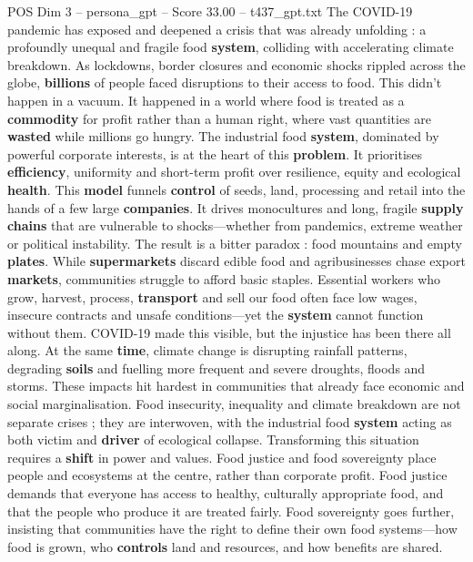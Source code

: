 \begin{textsample}{POS Dim 3 – persona\_gpt – Score 33.00 – t437\_gpt.txt}  \label{ex:f3_pos_023}
The COVID-19 pandemic has exposed and deepened a crisis that was already unfolding : a profoundly unequal and fragile food \textbf{system}, colliding with accelerating climate breakdown.
As lockdowns, border closures and economic shocks rippled across the globe, \textbf{billions} of people faced disruptions to their access to food.
This didn't happen in a vacuum.
It happened in a world where food is treated as a \textbf{commodity} for profit rather than a human right, where vast quantities are \textbf{wasted} while millions go hungry.
The industrial food \textbf{system}, dominated by powerful corporate interests, is at the heart of this \textbf{problem}.
It prioritises \textbf{efficiency}, uniformity and short-term profit over resilience, equity and ecological \textbf{health}.
This \textbf{model} funnels \textbf{control} of seeds, land, processing and retail into the hands of a few large \textbf{companies}.
It drives monocultures and long, fragile \textbf{supply} \textbf{chains} that are vulnerable to shocks—whether from pandemics, extreme weather or political instability.
The result is a bitter paradox : food mountains and empty \textbf{plates}.
While \textbf{supermarkets} discard edible food and agribusinesses chase export \textbf{markets}, communities struggle to afford basic staples.
Essential workers who grow, harvest, process, \textbf{transport} and sell our food often face low wages, insecure contracts and unsafe conditions—yet the \textbf{system} cannot function without them.
COVID-19 made this visible, but the injustice has been there all along.
At the same \textbf{time}, climate change is disrupting rainfall patterns, degrading \textbf{soils} and fuelling more frequent and severe droughts, floods and storms.
These impacts hit hardest in communities that already face economic and social marginalisation.
Food insecurity, inequality and climate breakdown are not separate crises ; they are interwoven, with the industrial food \textbf{system} acting as both victim and \textbf{driver} of ecological collapse.
Transforming this situation requires a \textbf{shift} in power and values.
Food justice and food sovereignty place people and ecosystems at the centre, rather than corporate profit.
Food justice demands that everyone has access to healthy, culturally appropriate food, and that the people who produce it are treated fairly.
Food sovereignty goes further, insisting that communities have the right to define their own food systems—how food is grown, who \textbf{controls} land and resources, and how benefits are shared.

\end{textsample}
